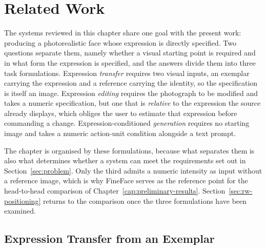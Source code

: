 \chapter{Related Work}\label{cap:related-work}
\glsresetall

%
%

The systems reviewed in this chapter share one goal with the present work: producing a
photorealistic face whose expression is directly specified. Two questions separate them, namely
whether a visual starting point is required and in what form the expression is specified, and the
answers divide them into three task formulations. Expression \emph{transfer} requires two visual
inputs, an exemplar carrying the expression and a reference carrying the identity, so the
specification is itself an image. Expression \emph{editing} requires the photograph to be
modified and takes a numeric specification, but one that is \emph{relative} to the expression the
source already displays, which obliges the user to estimate that expression before commanding a
change. Expression-conditioned \emph{generation} requires no starting image and takes a numeric action-unit condition alongside a text prompt.

The chapter is organised by these formulations, because what
separates them is also what determines whether a system can meet the requirements set out in
Section~\ref{sec:problem}. Only the third admits a numeric intensity as input without a reference
image, which is why FineFace \citep{varanka2024fineface} serves as the reference point for the
head-to-head comparison of Chapter~\ref{cap:preliminary-results}.
Section~\ref{sec:rw-positioning} returns to the comparison once the three formulations have been
examined.

\section{Expression Transfer from an Exemplar}\label{sec:rw-transfer}

